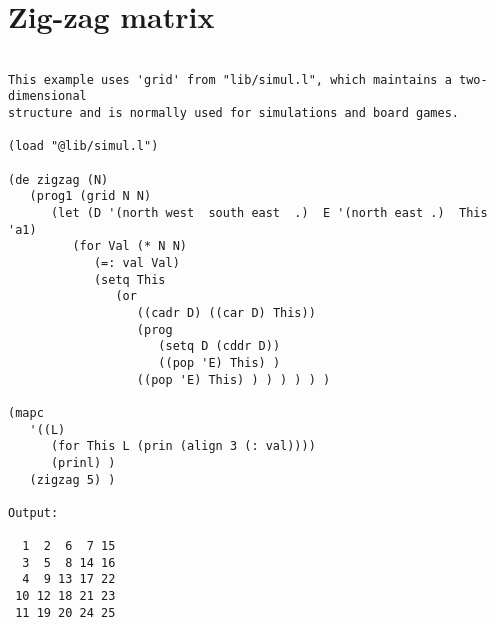 \section*{Zig-zag matrix}

\begin{verbatim}

This example uses 'grid' from "lib/simul.l", which maintains a two-dimensional
structure and is normally used for simulations and board games.

(load "@lib/simul.l")

(de zigzag (N)
   (prog1 (grid N N)
      (let (D '(north west  south east  .)  E '(north east .)  This 'a1)
         (for Val (* N N)
            (=: val Val)
            (setq This
               (or
                  ((cadr D) ((car D) This))
                  (prog
                     (setq D (cddr D))
                     ((pop 'E) This) )
                  ((pop 'E) This) ) ) ) ) ) )

(mapc
   '((L)
      (for This L (prin (align 3 (: val))))
      (prinl) )
   (zigzag 5) )

Output:

  1  2  6  7 15
  3  5  8 14 16
  4  9 13 17 22
 10 12 18 21 23
 11 19 20 24 25


\end{verbatim}

